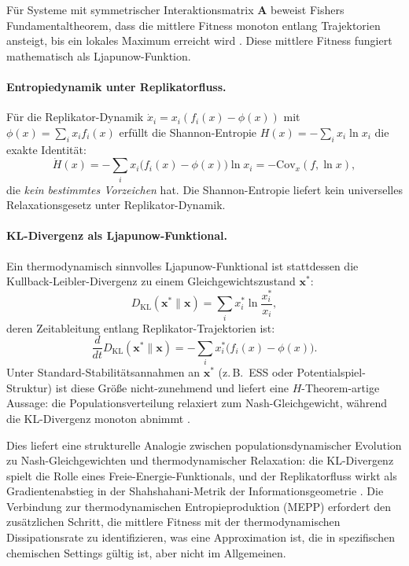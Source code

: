 \documentclass[12pt,a4paper]{article}
\theoremstyle{remark}
\begin{document}
F\"ur Systeme mit symmetrischer Interaktionsmatrix $\mathbf{A}$ beweist Fishers Fundamentaltheorem, dass die mittlere Fitness monoton entlang Trajektorien ansteigt, bis ein lokales Maximum erreicht wird \citep{ReplicatorEntropy}. Diese mittlere Fitness fungiert mathematisch als Ljapunow-Funktion.

\paragraph{Entropiedynamik unter Replikatorfluss.}
F\"ur die Replikator-Dynamik $\dot{x}_i = x_i(f_i(x) - \phi(x))$ mit $\phi(x) = \sum_i x_i f_i(x)$ erf\"ullt die Shannon-Entropie $H(x) = -\sum_i x_i \ln x_i$ die exakte Identit\"at:
\begin{equation}
\dot{H}(x) = -\sum_i x_i \big(f_i(x) - \phi(x)\big) \ln x_i = -\mathrm{Cov}_x(f, \ln x),
\end{equation}
die \emph{kein bestimmtes Vorzeichen} hat. Die Shannon-Entropie liefert kein universelles Relaxationsgesetz unter Replikator-Dynamik.

\paragraph{KL-Divergenz als Ljapunow-Funktional.}
Ein thermodynamisch sinnvolles Ljapunow-Funktional ist stattdessen die Kullback-Leibler-Divergenz zu einem Gleichgewichtszustand $\mathbf{x}^*$:
\begin{equation}
D_{\mathrm{KL}}(\mathbf{x}^* \| \mathbf{x}) = \sum_i x_i^* \ln \frac{x_i^*}{x_i},
\end{equation}
deren Zeitableitung entlang Replikator-Trajektorien ist:
\begin{equation}
\frac{d}{dt} D_{\mathrm{KL}}(\mathbf{x}^* \| \mathbf{x}) = -\sum_i x_i^* \big(f_i(x) - \phi(x)\big).
\end{equation}
Unter Standard-Stabilit\"atsannahmen an $\mathbf{x}^*$ (z.\,B.\ ESS oder Potentialspiel-Struktur) ist diese Gr\"o\ss{}e nicht-zunehmend und liefert eine $H$-Theorem-artige Aussage: die Populationsverteilung relaxiert zum Nash-Gleichgewicht, w\"ahrend die KL-Divergenz monoton abnimmt \citep{HofbauerSigmund1998,ReplicatorEntropy}.

Dies liefert eine strukturelle Analogie zwischen populationsdynamischer Evolution zu Nash-Gleichgewichten und thermodynamischer Relaxation: die KL-Divergenz spielt die Rolle eines Freie-Energie-Funktionals, und der Replikatorfluss wirkt als Gradientenabstieg in der Shahshahani-Metrik der Informationsgeometrie \citep{ReplicatorEntropy}. Die Verbindung zur thermodynamischen Entropieproduktion (MEPP) erfordert den zus\"atzlichen Schritt, die mittlere Fitness mit der thermodynamischen Dissipationsrate zu identifizieren, was eine Approximation ist, die in spezifischen chemischen Settings g\"ultig ist, aber nicht im Allgemeinen.
\end{document}
